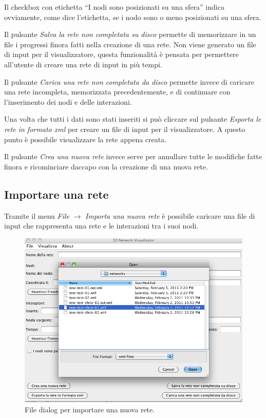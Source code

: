 \documentclass[a4paper,12pt]{article}
\begin{document}
Il checkbox con etichetta ``I nodi sono posizionati su una sfera'' indica ovviamente, come dice l'etichetta, se i nodo sono o meno posizionati su una sfera.

Il pulsante \textit{Salva la rete non completata su disco} permette di memorizzare in un file i progressi finora fatti nella creazione di una rete. Non viene generato un file di input per il visualizzatore, questa funzionalit\`a \`e pensata per permettere all'utente di creare una rete di input in pi\`u tempi.

Il pulsante \textit{Carica una rete non completata da disco} permette invece di caricare una rete incompleta, memorizzata precedentemente, e di continuare con l'inserimento dei nodi e delle interazioni.

Una volta che tutti i dati sono stati inseriti si pu\`o cliccare sul pulsante \textit{Esporta le rete in formato xml} per creare un file di input per il visualizzatore. A questo punto \`e possibile visualizzare la rete appena creata.

Il pulsante \textit{Crea una nuova rete} invece serve per annullare tutte le modifiche fatte finora e ricominciare daccapo con la creazione di una nuova rete.

\subsection{Importare una rete}
Tramite il menu \textit{File} $\rightarrow$ \textit{Importa una nuova rete} \`e possibile caricare una file di input che rappresenta una rete e le interazioni tra i suoi nodi.

\begin{figure}[htb!]
 \begin{center}
  \includegraphics[width=\textwidth]{images/image0.png}
 \end{center}
 \caption{File dialog per importare una nuova rete.}
 \label{fig:importnetwork}
\end{figure}
\end{document}
